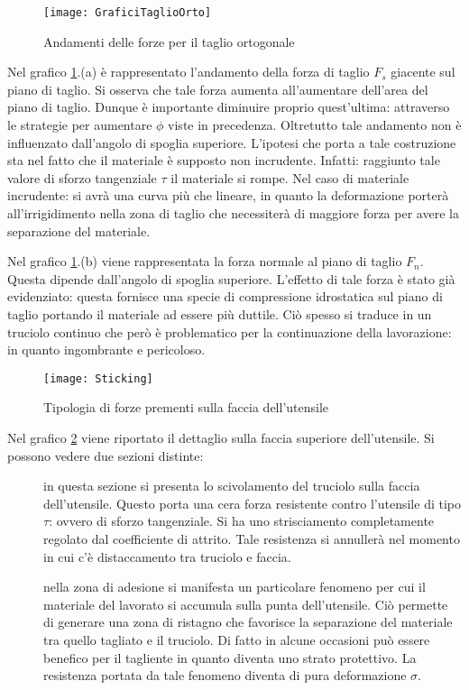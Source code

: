 \begin{figure}
\centering
\texttt{[image: GraficiTaglioOrto]}
\caption{Andamenti delle forze per il taglio ortogonale}
\label{fig:GarficiTaglioOrto}
\end{figure}

Nel grafico \ref{fig:GarficiTaglioOrto}.(a) è rappresentato l'andamento della forza di taglio 
$F_s$ giacente sul piano di taglio. Si osserva che tale forza aumenta all'aumentare dell'area 
del piano di taglio. 
Dunque è importante diminuire proprio quest'ultima: attraverso le strategie per 
aumentare $\phi$ viste in precedenza. Oltretutto tale andamento non è influenzato 
dall'angolo di spoglia superiore.
L'ipotesi che porta a tale costruzione sta nel fatto che il materiale è supposto non
incrudente. Infatti: raggiunto tale valore di sforzo tangenziale $\tau$ il materiale si 
rompe. Nel caso di materiale incrudente: si avrà una curva più che lineare, in quanto la 
deformazione porterà all'irrigidimento nella zona di taglio che necessiterà di maggiore
forza per avere la separazione del materiale.

Nel grafico \ref{fig:GarficiTaglioOrto}.(b) viene rappresentata la forza normale al piano di 
taglio $F_n$.
Questa dipende dall'angolo di spoglia superiore.
L'effetto di tale forza è stato già evidenziato: questa fornisce una specie di compressione 
idrostatica sul piano di taglio portando il materiale ad essere più duttile.
Ciò spesso si traduce in un truciolo continuo che però è problematico per la continuazione
della lavorazione: in quanto ingombrante e pericoloso.

\begin{figure}
\centering
\texttt{[image: Sticking]}
\caption{Tipologia di forze prementi sulla faccia dell'utensile}
\label{fig:sticking}
\end{figure}

Nel grafico \ref{fig:sticking} viene riportato il dettaglio sulla faccia superiore 
dell'utensile.
Si possono vedere due sezioni distinte:
\begin{description}
\item[] in questa sezione si presenta lo scivolamento del truciolo sulla faccia
dell'utensile. Questo porta una cera forza resistente contro l'utensile di tipo $\tau$: ovvero 
di sforzo tangenziale. Si ha uno strisciamento completamente regolato dal coefficiente di 
attrito. Tale resistenza si annullerà nel momento in cui c'è distaccamento tra truciolo e 
faccia.
\item[] nella zona di adesione si manifesta un particolare fenomeno per cui
il materiale del lavorato si accumula sulla punta dell'utensile. Ciò permette di generare una 
zona di ristagno che favorisce la separazione del materiale tra quello tagliato e il
truciolo. Di fatto in alcune occasioni può essere benefico per il tagliente in quanto
diventa uno strato protettivo. La resistenza portata da tale fenomeno diventa di pura 
deformazione $\sigma$. 
\end{description}

